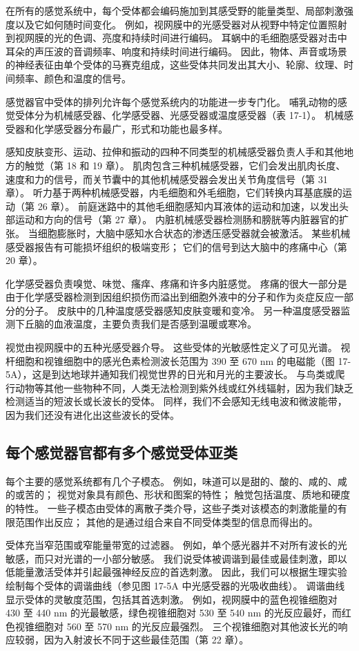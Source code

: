 在所有的感觉系统中，每个受体都会编码施加到其感受野的能量类型、局部刺激强度以及它如何随时间变化。 例如，视网膜中的光感受器对从视野中特定位置照射到视网膜的光的色调、亮度和持续时间进行编码。 耳蜗中的毛细胞感受器对击中耳朵的声压波的音调频率、响度和持续时间进行编码。 因此，物体、声音或场景的神经表征由单个受体的马赛克组成，这些受体共同发出其大小、轮廓、纹理、时间频率、颜色和温度的信号。

感觉器官中受体的排列允许每个感觉系统内的功能进一步专门化。 哺乳动物的感觉受体分为机械感受器、化学感受器、光感受器或温度感受器（表 17-1）。 机械感受器和化学感受器分布最广，形式和功能也最多样。

感知皮肤变形、运动、拉伸和振动的四种不同类型的机械感受器负责人手和其他地方的触觉（第 18 和 19 章）。 肌肉包含三种机械感受器，它们会发出肌肉长度、速度和力的信号，而关节囊中的其他机械感受器会发出关节角度信号（第 31 章）。 听力基于两种机械感受器，内毛细胞和外毛细胞，它们转换内耳基底膜的运动（第 26 章）。 前庭迷路中的其他毛细胞感知内耳液体的运动和加速，以发出头部运动和方向的信号（第 27 章）。 内脏机械感受器检测肠和膀胱等内脏器官的扩张。 当细胞膨胀时，大脑中感知水合状态的渗透压感受器就会被激活。 某些机械感受器报告有可能损坏组织的极端变形； 它们的信号到达大脑中的疼痛中心（第 20 章）。

化学感受器负责嗅觉、味觉、瘙痒、疼痛和许多内脏感觉。 疼痛的很大一部分是由于化学感受器检测到因组织损伤而溢出到细胞外液中的分子和作为炎症反应一部分的分子。 皮肤中的几种温度感受器感知皮肤变暖和变冷。 另一种温度感受器监测下丘脑的血液温度，主要负责我们是否感到温暖或寒冷。

视觉由视网膜中的五种光感受器介导。 这些受体的光敏感性定义了可见光谱。 视杆细胞和视锥细胞中的感光色素检测波长范围为 390 至 670 nm 的电磁能（图 17-5A），这是到达地球并通知我们视觉世界的日光和月光的主要波长。 与鸟类或爬行动物等其他一些物种不同，人类无法检测到紫外线或红外线辐射，因为我们缺乏检测适当的短波长或长波长的受体。 同样，我们不会感知无线电波和微波能带，因为我们还没有进化出这些波长的受体。

\subsection{每个感觉器官都有多个感觉受体亚类}

每个主要的感觉系统都有几个子模态。 例如，味道可以是甜的、酸的、咸的、咸的或苦的； 视觉对象具有颜色、形状和图案的特性； 触觉包括温度、质地和硬度的特性。 一些子模态由受体的离散子类介导，这些子类对该模态的刺激能量的有限范围作出反应； 其他的是通过组合来自不同受体类型的信息而得出的。

受体充当窄范围或窄能量带宽的过滤器。 例如，单个感光器并不对所有波长的光敏感，而只对光谱的一小部分敏感。 我们说受体被调谐到最佳或最佳刺激，即以低能量激活受体并引起最强神经反应的首选刺激。 因此，我们可以根据生理实验绘制每个受体的调谐曲线（参见图 17-5A 中光感受器的光吸收曲线）。 调谐曲线显示受体的灵敏度范围，包括其首选刺激。 例如，视网膜中的蓝色视锥细胞对 430 至 440 nm 的光最敏感，绿色视锥细胞对 530 至 540 nm 的光反应最好，而红色视锥细胞对 560 至 570 nm 的光反应最强烈。 三个视锥细胞对其他波长光的响应较弱，因为入射波长不同于这些最佳范围（第 22 章）。

